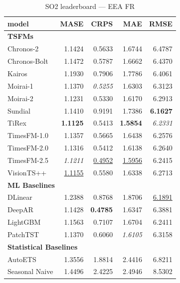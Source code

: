 \begin{table}[H]
\caption{SO2 leaderboard --- EEA FR}
\centering
\begin{small}
\begin{tabular}{lrrrr}
\toprule
model & MASE & CRPS & MAE & RMSE \\
\midrule
\multicolumn{5}{l}{\textbf{TSFMs}} \\
Chronos-2 & 1.1424 & 0.5633 & 1.6744 & 6.4787 \\
Chronos-Bolt & 1.1472 & 0.5787 & 1.6662 & 6.4370 \\
Kairos & 1.1930 & 0.7906 & 1.7786 & 6.4061 \\
Moirai-1 & 1.1370 & \textit{0.5255} & 1.6303 & 6.3123 \\
Moirai-2 & 1.1231 & 0.5330 & 1.6170 & 6.2913 \\
Sundial & 1.1410 & 0.9191 & 1.7386 & \textbf{6.1627} \\
TiRex & \textbf{1.1125} & 0.5413 & \textbf{1.5854} & \textit{6.2331} \\
TimesFM-1.0 & 1.1357 & 0.5665 & 1.6438 & 6.2576 \\
TimesFM-2.0 & 1.1316 & 0.5412 & 1.6138 & 6.2640 \\
TimesFM-2.5 & \textit{1.1211} & \underline{0.4952} & \underline{1.5956} & 6.2415 \\
VisionTS++ & \underline{1.1155} & 0.5580 & 1.6338 & 6.2713 \\
\midrule
\multicolumn{5}{l}{\textbf{ML Baselines}} \\
DLinear & 1.2388 & 0.8768 & 1.8706 & \underline{6.1891} \\
DeepAR & 1.1428 & \textbf{0.4785} & 1.6347 & 6.3881 \\
LightGBM & 1.1563 & 0.7107 & 1.6704 & 6.2411 \\
PatchTST & 1.1370 & 0.6060 & \textit{1.6105} & 6.3158 \\
\midrule
\multicolumn{5}{l}{\textbf{Statistical Baselines}} \\
AutoETS & 1.3556 & 1.8814 & 2.4416 & 6.8211 \\
Seasonal Naive & 1.4496 & 2.4225 & 2.4946 & 8.5302 \\
\bottomrule
\end{tabular}
\end{small}
\end{table}